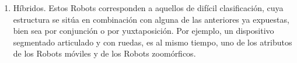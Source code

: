 \begin{enumerate}[1.]
	\item Híbridos.	Estos Robots corresponden a aquellos de difícil clasificación, cuya estructura se sitúa en combinación con alguna de las anteriores ya expuestas, bien sea por conjunción o por yuxtaposición. Por ejemplo, un dispositivo segmentado articulado y con ruedas, es al mismo tiempo, uno de los atributos de los Robots móviles y de los Robots zoomórficos.
\end{enumerate}






